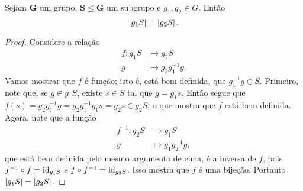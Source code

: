 \begin{prop}
Sejam $\bm G$ um grupo, $\bm S \leq \bm G$ um subgrupo e $g_1,g_2 \in G$. Então
	\begin{equation*}
	\left\vert{g_1S}\right\vert=\left\vert{g_2S}\right\vert.
	\end{equation*}
\end{prop}
\begin{proof}
Considere a relação
	\begin{align*}
	f: g_1S &\to g_2S \\
		g &\mapsto g_2g_1^{-1}g.
	\end{align*}
Vamos mostrar que $f$ é função; isto é, está bem definida, que $g_1^{-1}g \in S$. Primeiro, note que, se $g \in g_1S$, existe $s\in S$ tal que $g=g_1s$. Então segue que $f(s)=g_2g_1^{-1}g=g_2g_1^{-1}g_1s=g_2s \in g_2S$, o que mostra que $f$ está bem definida. Agora, note que a função
	\begin{align*}
	f^{-1}: g_2S &\to g_1S \\
		g &\mapsto g_1g_2^{-1}g,
	\end{align*}
que está bem definida pelo mesmo argumento de cima, é a inversa de $f$, pois $f^{-1} \circ f=\mathrm{id}_{g_1S}$ e $f \circ f^{-1}=\mathrm{id}_{g_2S}$. Isso mostra que $f$ é uma bijeção. Portanto $\left\vert{g_1S}\right\vert=\left\vert{g_2S}\right\vert$.

\end{proof}

